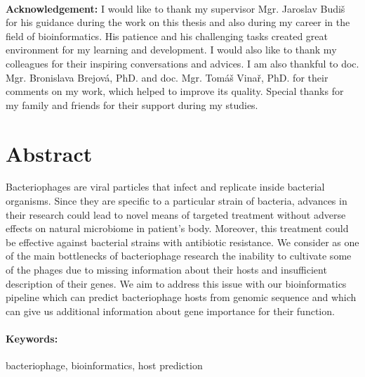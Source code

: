 \documentclass[12pt, oneside]{book}
\begin{document}

\frontmatter

\setcounter{page}{1}
\newpage 
~

\vfill
{\bf Acknowledgement:}
I would like to thank my supervisor Mgr. Jaroslav Budiš for his guidance during the work on this thesis and also during my career in the field of bioinformatics.
His patience and his challenging tasks created great environment for my learning and development.
I would also like to thank my colleagues for their inspiring conversations and advices.
I am also thankful to doc. Mgr. Bronislava Brejová, PhD. and doc. Mgr. Tomáš Vinař, PhD. for their comments on my work, which helped to improve its quality.
Special thanks for my family and friends for their support during my studies.


\newpage

\section*{Abstract}

Bacteriophages are viral particles that infect and replicate inside bacterial organisms. Since they are specific to a
particular strain of bacteria, advances in their research could lead to novel means of targeted treatment without
adverse effects on natural microbiome in patient’s body. Moreover, this treatment could be effective against
bacterial strains with antibiotic resistance. We consider as one of the main bottlenecks of bacteriophage research the
inability to cultivate some of the phages due to missing information about their hosts and insufficient description of
their genes. We aim to address this issue with our bioinformatics pipeline which can predict bacteriophage hosts
from genomic sequence and which can give us additional information about gene importance for their function.

\paragraph*{Keywords:} bacteriophage, bioinformatics, host prediction 

\end{document}
